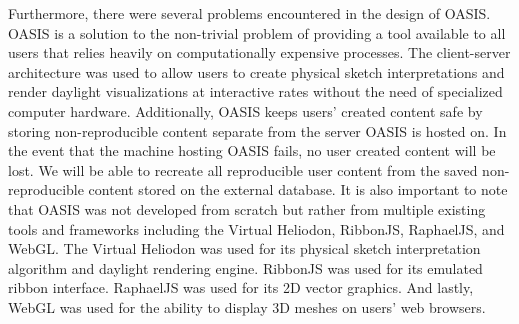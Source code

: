 Furthermore, there were several problems encountered in the design of OASIS.
OASIS is a solution to the non-trivial problem of providing a tool available to all users that relies heavily on computationally expensive processes. The client-server architecture was used to allow users to create physical sketch interpretations and render daylight visualizations at interactive rates without the need of specialized computer hardware. 
Additionally, OASIS keeps users' created content safe by storing non-reproducible content separate from the server OASIS is hosted on. In the event that the machine hosting OASIS fails, no user created content will be lost.
We will be able to recreate all reproducible user content from the saved non-reproducible content stored on the external database.
It is also important to note that OASIS was not developed from scratch but rather from multiple existing tools and frameworks including the Virtual Heliodon, RibbonJS, RaphaelJS, and WebGL.
The Virtual Heliodon was used for its physical sketch interpretation algorithm and daylight rendering engine.
RibbonJS was used for its  emulated ribbon interface.
RaphaelJS was used for its 2D vector graphics.
And lastly,  WebGL was used for the ability to display 3D meshes on users' web browsers.
